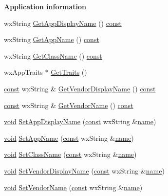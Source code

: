\begin{Indent}{\bf Application information}\par
\begin{DoxyCompactItemize}
\item 
wx\+String \hyperlink{classwx_app_console_a83aa5fdf1e636dc441b62ceb95c8bf5a}{Get\+App\+Display\+Name} () \hyperlink{getopt1_8c_a2c212835823e3c54a8ab6d95c652660e}{const} 
\item 
wx\+String \hyperlink{classwx_app_console_a2bfe9c53c57d61f8b115705796f258eb}{Get\+App\+Name} () \hyperlink{getopt1_8c_a2c212835823e3c54a8ab6d95c652660e}{const} 
\item 
wx\+String \hyperlink{classwx_app_console_a938d78da101d4edfbd76387ad4d221be}{Get\+Class\+Name} () \hyperlink{getopt1_8c_a2c212835823e3c54a8ab6d95c652660e}{const} 
\item 
wx\+App\+Traits $\ast$ \hyperlink{classwx_app_console_a75ed8ce022a4ca58785f14f736853e93}{Get\+Traits} ()
\item 
\hyperlink{getopt1_8c_a2c212835823e3c54a8ab6d95c652660e}{const} wx\+String \& \hyperlink{classwx_app_console_aff0e285cecca295bc6de1ad8323093df}{Get\+Vendor\+Display\+Name} () \hyperlink{getopt1_8c_a2c212835823e3c54a8ab6d95c652660e}{const} 
\item 
\hyperlink{getopt1_8c_a2c212835823e3c54a8ab6d95c652660e}{const} wx\+String \& \hyperlink{classwx_app_console_af73ec0d186dd10b7fdabb57cf097bef8}{Get\+Vendor\+Name} () \hyperlink{getopt1_8c_a2c212835823e3c54a8ab6d95c652660e}{const} 
\item 
\hyperlink{sound_8c_ae35f5844602719cf66324f4de2a658b3}{void} \hyperlink{classwx_app_console_a716fee0bf023e73e80c75dc9e817a8b2}{Set\+App\+Display\+Name} (\hyperlink{getopt1_8c_a2c212835823e3c54a8ab6d95c652660e}{const} wx\+String \&\hyperlink{lib_2expat_8h_a1b49b495b59f9e73205b69ad1a2965b0}{name})
\item 
\hyperlink{sound_8c_ae35f5844602719cf66324f4de2a658b3}{void} \hyperlink{classwx_app_console_a31ba1a76d63a2265d981ceedbfd6d5cf}{Set\+App\+Name} (\hyperlink{getopt1_8c_a2c212835823e3c54a8ab6d95c652660e}{const} wx\+String \&\hyperlink{lib_2expat_8h_a1b49b495b59f9e73205b69ad1a2965b0}{name})
\item 
\hyperlink{sound_8c_ae35f5844602719cf66324f4de2a658b3}{void} \hyperlink{classwx_app_console_aabcfbdc9d4ec3f31fe14589eee873960}{Set\+Class\+Name} (\hyperlink{getopt1_8c_a2c212835823e3c54a8ab6d95c652660e}{const} wx\+String \&\hyperlink{lib_2expat_8h_a1b49b495b59f9e73205b69ad1a2965b0}{name})
\item 
\hyperlink{sound_8c_ae35f5844602719cf66324f4de2a658b3}{void} \hyperlink{classwx_app_console_a5ad4d1e383bc2fbb2d1c12f118140d4a}{Set\+Vendor\+Display\+Name} (\hyperlink{getopt1_8c_a2c212835823e3c54a8ab6d95c652660e}{const} wx\+String \&\hyperlink{lib_2expat_8h_a1b49b495b59f9e73205b69ad1a2965b0}{name})
\item 
\hyperlink{sound_8c_ae35f5844602719cf66324f4de2a658b3}{void} \hyperlink{classwx_app_console_afc276a78f5ad56d4f34fcf0e93872913}{Set\+Vendor\+Name} (\hyperlink{getopt1_8c_a2c212835823e3c54a8ab6d95c652660e}{const} wx\+String \&\hyperlink{lib_2expat_8h_a1b49b495b59f9e73205b69ad1a2965b0}{name})
\end{DoxyCompactItemize}
\end{Indent}
